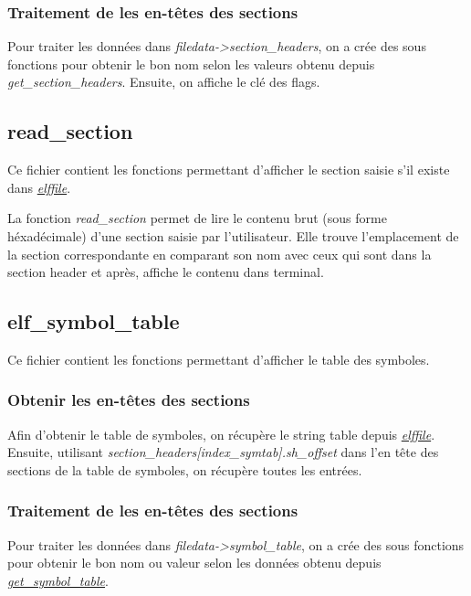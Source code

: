 \documentclass[a4paper]{article} %
\begin{document}
\subsubsection*{Traitement de les en-têtes des sections}
Pour traiter les données dans \textit{filedata->section\_headers}, on a crée des sous 
fonctions pour obtenir le bon nom selon les valeurs obtenu depuis 
\textit{get\_section\_headers}. Ensuite, on affiche le clé des flags. 



\subsection{read\_section}
\label{sec:section}
\noindent Ce fichier contient les fonctions permettant d'afficher le section saisie s'il existe
dans \hyperref[sec:elffile]{\textit{elffile}}. 
\newline

La fonction \textit{read\_section} permet de lire le contenu brut 
(sous forme héxadécimale) d'une section saisie par l'utilisateur. Elle trouve 
l'emplacement de la section correspondante en comparant son nom avec ceux qui 
sont dans la section header et après, affiche le contenu dans terminal.



\subsection{elf\_symbol\_table}
\label{sec:symbol}
\noindent Ce fichier contient les fonctions permettant d'afficher le table des symboles.

\subsubsection*{Obtenir les en-têtes des sections}
\label{sec:getsymtab}
Afin d'obtenir le table de symboles, on récupère le string table depuis \hyperref[sec:elffile]{\textit{elffile}}. 
Ensuite, utilisant \textit{section\_headers[index\_symtab].sh\_offset} dans 
l'en tête des sections de la table de symboles, on récupère toutes les entrées.

\subsubsection*{Traitement de les en-têtes des sections}
Pour traiter les données dans \textit{filedata->symbol\_table}, on a crée des sous 
fonctions pour obtenir le bon nom ou valeur selon les données obtenu depuis 
\hyperref[sec:getsymtab]{\textit{get\_symbol\_table}}.
\end{document}

